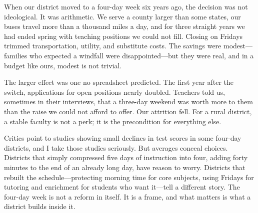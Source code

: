 \documentclass[11pt]{article}
\begin{document}
\clearpage
{}
\begin{passage}
When our district moved to a four-day week six years ago, the decision was not ideological. It was arithmetic. We serve a county larger than some states, our buses travel more than a thousand miles a day, and for three straight years we had ended spring with teaching positions we could not fill. Closing on Fridays trimmed transportation, utility, and substitute costs. The savings were modest---families who expected a windfall were disappointed---but they were real, and in a budget like ours, modest is not trivial.

The larger effect was one no spreadsheet predicted. The first year after the switch, applications for open positions nearly doubled. Teachers told us, sometimes in their interviews, that a three-day weekend was worth more to them than the raise we could not afford to offer. Our attrition fell. For a rural district, a stable faculty is not a perk; it is the precondition for everything else.

Critics point to studies showing small declines in test scores in some four-day districts, and I take those studies seriously. But averages conceal choices. Districts that simply compressed five days of instruction into four, adding forty minutes to the end of an already long day, have reason to worry. Districts that rebuilt the schedule---protecting morning time for core subjects, using Fridays for tutoring and enrichment for students who want it---tell a different story. The four-day week is not a reform in itself. It is a frame, and what matters is what a district builds inside it.
\end{passage}
\end{document}
